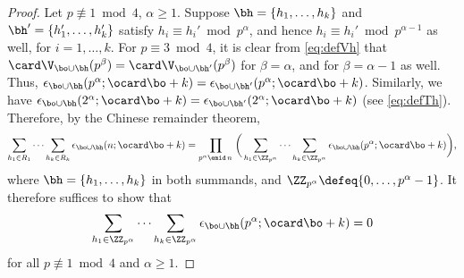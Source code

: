 \documentclass[12pt, reqno, twoside, letterpaper]{amsart}
\begin{document}
\begin{proof}
%
Let $p \not\equiv 1 \bmod 4$, $\alpha \ge 1$.
%
Suppose $\bh = \{h_1,\ldots,h_k\}$ and 
$\bh' = \{h_1',\ldots,h_k'\}$  
satisfy $h_i \equiv h_i' \bmod p^{\alpha}$, and hence 
$h_i \equiv h_i' \bmod p^{\alpha - 1}$ as well, for 
$i = 1,\ldots,k$.
%
For $p \equiv 3 \bmod 4$, it is clear from \eqref{eq:defVh} that
$
 \card \V_{\bo \cup \bh}(p^{\beta}) 
  = 
   \card \V_{\bo \cup \bh'}(p^{\beta})
$ 
for $\beta = \alpha$, and for $\beta = \alpha - 1$ as well.
%
Thus, 
$
 \epsilon_{\bo \cup \bh}(p^{\alpha}; \ocard \bo + k)
 = 
  \epsilon_{\bo \cup \bh'}(p^{\alpha}; \ocard \bo + k)
$.
%
Similarly, we have   
$
 \epsilon_{\bo \cup \bh}(2^{\alpha}; \ocard \bo + k) 
  = 
   \epsilon_{\bo \cup \bh'}(2^{\alpha}; \ocard \bo + k)
$
(see \eqref{eq:defTh}).
%
Therefore, by the Chinese remainder theorem, 
\[
 \sum_{h_1 \in R_1} 
  \cdots 
   \sum_{h_k \in R_k}
    \epsilon_{\bo \cup \bh}(n;\ocard \bo + k)
      =
       \prod_{p^{\alpha} \emid \, n \,} 
        \bigg(
         \sum_{h_1 \in \ZZ_{p^{\alpha}}}
          \cdots 
           \sum_{h_k \in \ZZ_{p^{\alpha}}}
            \epsilon_{\bo \cup \bh}(p^{\alpha};\ocard \bo + k) 
         \bigg),
\]
where $\bh = \{h_1,\ldots,h_k\}$ in both summands, and 
$\ZZ_{p^{\alpha}} \defeq \{0,\ldots,p^{\alpha} - 1\}$.
%
It therefore suffices to show that  
\begin{equation}
 \label{eq:cancelp}
  \sum_{h_1 \in \ZZ_{p^{\alpha}}}
   \cdots 
    \sum_{h_k \in \ZZ_{p^{\alpha}}}
     \epsilon_{\bo \cup \bh}(p^{\alpha};\ocard \bo + k) 
      =
       0
\end{equation}
for all $p \not\equiv 1 \bmod 4$ and $\alpha \ge 1$.


\end{proof}
\end{document}
